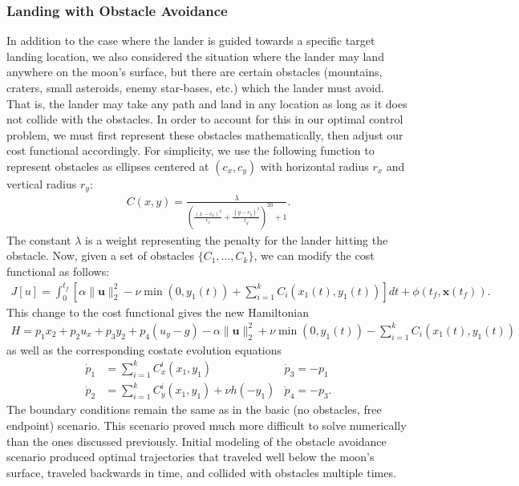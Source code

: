 \documentclass{article}
\begin{document}
\subsubsection{Landing with Obstacle Avoidance}
In addition to the case where the lander is guided towards a specific target landing location, we also considered the situation where the lander may land anywhere on the moon's surface, but there are certain obstacles (mountains, craters, small asteroids, enemy star-bases, etc.) which the lander must avoid. That is, the lander may take any path and land in any location as long as it does not collide with the obstacles. In order to account for this in our optimal control problem, we must first represent these obstacles mathematically, then adjust our cost functional accordingly. For simplicity, we use the following function to represent obstacles as ellipses centered at $(c_x, c_y)$ with horizontal radius $r_x$ and vertical radius $r_y$:
\begin{align}
    C(x, y) = \frac{\lambda}{\left( \frac{(x - c_x)^2}{r_x} + \frac{(y - c_y)^2}{r_y} \right)^{20} + 1}.
\end{align} The constant $\lambda$ is a weight representing the penalty for the lander hitting the obstacle. Now, given a set of obstacles $\{C_1, ..., C_k\}$, we can modify the cost functional as follows:
\begin{align}
    J[u] = \int_{0}^{t_f} \left[\alpha \|\mathbf{u}\|_2^2 - \nu\min(0, y_1(t)) + \sum_{i=1}^{k}{C_i(x_1(t), y_1(t))} \right] dt + \phi(t_f, \mathbf{x}(t_f)).
\end{align}
This change to the cost functional gives the new Hamiltonian
\begin{align}
    H = p_1 x_2 + p_2 u_x + p_3 y_2 + p_4(u_y - g) - \alpha \|\mathbf{u}\|_2^2 + \nu\min(0, y_1(t)) - \sum_{i=1}^{k}{C_i(x_1(t), y_1(t))}
\end{align}
as well as the corresponding costate evolution equations 
\begin{align}
    \dot{p}_1 &= \sum_{i=1}^{k}{C_x^i(x_1, y_1)}  & \dot{p}_3 = -p_1 \\[1ex]
    \dot{p}_2 & = \sum_{i=1}^{k}{C_y^i(x_1, y_1)} + \nu h(-y_1) & \dot{p}_4 = -p_3.
\end{align}
The boundary conditions remain the same as in the basic (no obstacles, free endpoint) scenario.
This scenario proved much more difficult to solve numerically than the ones discussed previously. 
Initial modeling of the obstacle avoidance scenario produced optimal trajectories that traveled well below the moon's surface, traveled backwards in time, and collided with obstacles multiple times. 
\end{document}
